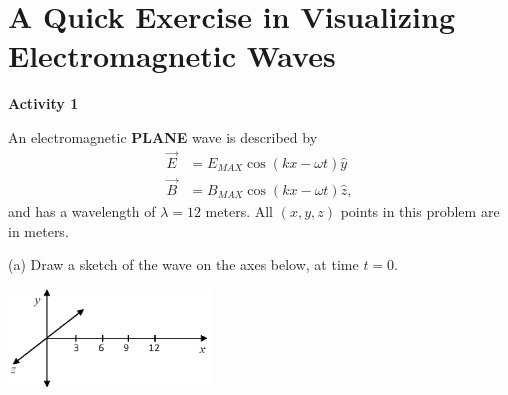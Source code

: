 \section{A Quick Exercise in Visualizing Electromagnetic Waves}

\makelabheader %

\vspace{0.1in}
%

\textbf{Activity 1}

An electromagnetic \textbf{PLANE} wave is described by
\begin{align*}
\vec E &= E_{MAX} \cos \left ( kx - \omega t \right ) \hat y\\
\vec B &= B_{MAX} \cos \left ( kx - \omega t \right ) \hat z,
\end{align*}
and has a wavelength of $\lambda =12$ meters.  All $(x,y,z)$ points in this problem are in meters.
\vspace{0.1in}

(a) Draw a sketch of the wave on the axes below, at time $t=0$.
\begin{center}
\includegraphics[width=0.4\textwidth]{em_plane_waves/em_waves_axes.eps}
\end{center}

